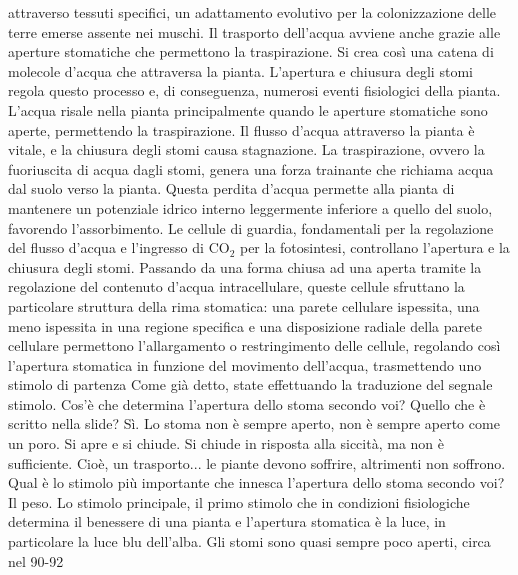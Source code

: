 \documentclass[11pt, a4paper]{article}
\begin{document}
\begin{spacing}{1.15}
attraverso tessuti specifici, un adattamento evolutivo per la colonizzazione delle terre emerse assente nei muschi.  Il trasporto dell'acqua avviene anche grazie alle aperture stomatiche che permettono la traspirazione. Si crea così una catena di molecole d'acqua che attraversa la pianta. L'apertura e chiusura degli stomi regola questo processo e, di conseguenza, numerosi eventi fisiologici della pianta. L'acqua risale nella pianta principalmente quando le aperture stomatiche sono aperte, permettendo la traspirazione. Il flusso d'acqua attraverso la pianta è vitale, e la chiusura degli stomi causa stagnazione. La traspirazione, ovvero la fuoriuscita di acqua dagli stomi, genera una forza trainante che richiama acqua dal suolo verso la pianta. Questa perdita d'acqua permette alla pianta di mantenere un potenziale idrico interno leggermente inferiore a quello del suolo, favorendo l'assorbimento. Le cellule di guardia, fondamentali per la regolazione del flusso d'acqua e l'ingresso di $\text{CO}_2$ per la fotosintesi, controllano l'apertura e la chiusura degli stomi.  Passando da una forma chiusa ad una aperta tramite la regolazione del contenuto d'acqua intracellulare,  queste cellule sfruttano la particolare struttura della rima stomatica: una parete cellulare ispessita, una meno ispessita in una regione specifica e una disposizione radiale della parete cellulare permettono l'allargamento o restringimento delle cellule, regolando così l'apertura stomatica in funzione del movimento dell'acqua, trasmettendo uno stimolo di partenza Come già detto, state effettuando la traduzione del segnale stimolo. Cos'è che determina l'apertura dello stoma secondo voi? Quello che è scritto nella slide? Sì. Lo stoma non è sempre aperto, non è sempre aperto come un poro. Si apre e si chiude. Si chiude in risposta alla siccità, ma non è sufficiente. Cioè, un trasporto... le piante devono soffrire, altrimenti non soffrono. Qual è lo stimolo più importante che innesca l'apertura dello stoma secondo voi? Il peso. Lo stimolo principale, il primo stimolo che in condizioni fisiologiche determina il benessere di una pianta e l'apertura stomatica è la luce, in particolare la luce blu dell'alba. Gli stomi sono quasi sempre poco aperti, circa nel 90-92%
\end{spacing}
\end{document}
